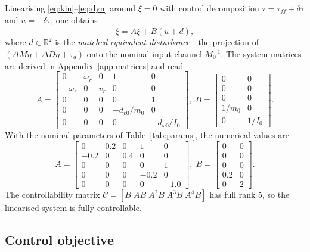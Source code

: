 \documentclass[conference]{IEEEtran}
\newcommand{\R}{\mathbb{R}}
\begin{document}
Linearising \eqref{eq:kin}--\eqref{eq:dyn} around $\xi=0$ with control
decomposition $\tau=\tau_{ff}+\delta\tau$ and $u=-\delta\tau$, one obtains
\begin{equation}
\dot\xi = A\xi + B(u+d),
\label{eq:lin}
\end{equation}
where $d\in\R^2$ is the \emph{matched equivalent disturbance}---the projection
of $(\Delta M\dot\eta+\Delta D\eta+\tau_d)$ onto the nominal input channel
$M_0^{-1}$. The system matrices are derived in
Appendix~\ref{app:matrices} and read
\begin{equation}
A=\begin{bmatrix}
0 & \omega_r & 0 & 1 & 0\\
-\omega_r & 0 & v_r & 0 & 0\\
0 & 0 & 0 & 0 & 1\\
0 & 0 & 0 & -d_{v0}/m_0 & 0\\
0 & 0 & 0 & 0 & -d_{\omega 0}/I_0
\end{bmatrix},\;
B=\begin{bmatrix}
0 & 0\\ 0 & 0\\ 0 & 0\\ 1/m_0 & 0\\ 0 & 1/I_0
\end{bmatrix}.
\label{eq:AB}
\end{equation}
With the nominal parameters of Table~\ref{tab:params}, the numerical values
are
\begin{equation}
A=\!\begin{bmatrix}
0 & 0.2 & 0 & 1 & 0\\
-0.2 & 0 & 0.4 & 0 & 0\\
0 & 0 & 0 & 0 & 1\\
0 & 0 & 0 & -0.2 & 0\\
0 & 0 & 0 & 0 & -1.0
\end{bmatrix}\!,\;
B=\!\begin{bmatrix}
0 & 0\\ 0 & 0\\ 0 & 0\\ 0.2 & 0\\ 0 & 2
\end{bmatrix}\!.
\label{eq:ABnum}
\end{equation}
The controllability matrix $\mathcal{C}=[B\;AB\;A^2B\;A^3B\;A^4B]$ has full
rank 5, so the linearised system is fully controllable.

\subsection{Control objective}
\end{document}
